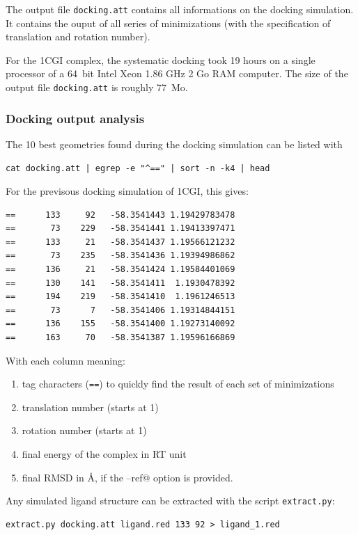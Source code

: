 \documentclass[12pt,a4paper]{article}
\begin{document}
The output file {\tt docking.att} contains all informations on the docking simulation. 
It contains the ouput of all series of minimizations (with the specification of translation and rotation number).

For the 1CGI complex, the systematic docking took 19 hours on a single processor of a 64~bit Intel Xeon 1.86 GHz 2 Go RAM computer.
The size of the output file {\tt docking.att} is roughly 77~Mo.

\subsubsection{Docking output analysis}

The 10 best geometries found during the docking simulation can be listed with

\begin{verbatim}
cat docking.att | egrep -e "^==" | sort -n -k4 | head
\end{verbatim}

For the previsous docking simulation of 1CGI, this gives:

\begin{verbatim}
==      133     92   -58.3541443 1.19429783478
==       73    229   -58.3541441 1.19413397471
==      133     21   -58.3541437 1.19566121232
==       73    235   -58.3541436 1.19394986862
==      136     21   -58.3541424 1.19584401069
==      130    141   -58.3541411  1.1930478392
==      194    219   -58.3541410  1.1961246513
==       73      7   -58.3541406 1.19314844151
==      136    155   -58.3541400 1.19273140092
==      163     70   -58.3541387 1.19596166869
\end{verbatim}

With each column meaning:
\begin{enumerate}
\item tag characters ({\tt ==}) to quickly find the result of each set of minimizations
\item translation number (starts at 1)
\item rotation number (starts at 1)
\item final energy of the complex in RT unit
\item final RMSD in \AA, if the \verb@--ref@ option is provided.
\end{enumerate}

Any simulated ligand structure can be extracted with the script {\tt extract.py}:

\begin{verbatim}
extract.py docking.att ligand.red 133 92 > ligand_1.red
\end{verbatim}
\end{document}
